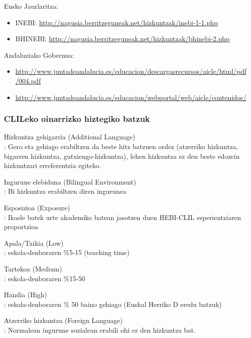 \documentclass[
]{book}
\providecommand{\tightlist}{%
  \setlength{\itemsep}{0pt}\setlength{\parskip}{0pt}}
\begin{document}
Eusko Jaurlaritza:

\begin{itemize}
\tightlist
\item
  INEBI: \url{http://nagusia.berritzeguneak.net/hizkuntzak/inebi-1-1.php}
\item
  BHINEBI: \url{http://nagusia.berritzeguneak.net/hizkuntzak/bhinebi-2.php}
\end{itemize}

Andaluziako Gobernua:

\begin{itemize}
\tightlist
\item
  \url{http://www.juntadeandalucia.es/educacion/descargasrecursos/aicle/html/pdf/004.pdf}
\item
  \url{http://www.juntadeandalucia.es/educacion/webportal/web/aicle/contenidos/}
\end{itemize}

\hypertarget{clileko-oinarrizko-hiztegiko-batzuk}{%
\subsubsection{CLILeko oinarrizko hiztegiko batzuk}\label{clileko-oinarrizko-hiztegiko-batzuk}}

Hizkuntza gehigarria (Additional Language)\\
: Gero eta gehiago erabiltzen da beste hitz batzuen ordez (atzerriko hizkuntza, bigarren hizkuntza, gutxiengo-hizkuntza), lehen hizkuntza ez den beste edozein hizkuntzari erreferentzia egiteko.

Ingurune elebiduna (Bilingual Environment)\\
: Bi hizkuntza erabiltzen diren ingurunea

Esposizioa (Exposure)\\
: Ikasle batek urte akademiko batean jasotzen duen HEBI-CLIL esperientziaren proportzioa

Apala/Txikia (Low)\\
: eskola-denboraren \%5-15 (teaching time)

Tartekoa (Medium)\\
: eskola-denboraren \%15-50

Handia (High)\\
: eskola-denboraren \% 50 baino gehiago (Euskal Herriko D eredu batzuk)

Atzerriko hizkuntza (Foreign Language)\\
: Normalean ingurune sozialean erabili ohi ez den hizkuntza bat.
\end{document}
